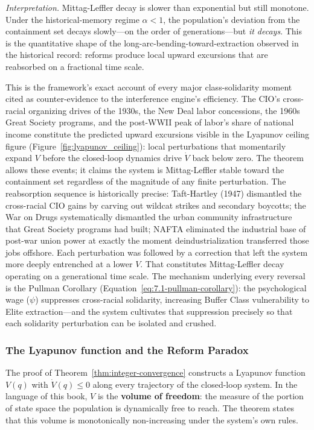 \noindent \textit{Interpretation.} Mittag-Leffler decay is slower than exponential but still monotone. Under the historical-memory regime $\alpha < 1$, the population's deviation from the containment set decays slowly---on the order of generations---but \textit{it decays}. This is the quantitative shape of the long-arc-bending-toward-extraction observed in the historical record: reforms produce local upward excursions that are reabsorbed on a fractional time scale.

This is the framework's exact account of every major class-solidarity moment cited as counter-evidence to the interference engine's efficiency. The CIO's cross-racial organizing drives of the 1930s, the New Deal labor concessions, the 1960s Great Society programs, and the post-WWII peak of labor's share of national income constitute the predicted upward excursions visible in the Lyapunov ceiling figure (Figure~\ref{fig:lyapunov_ceiling}): local perturbations that momentarily expand $V$ before the closed-loop dynamics drive $\dot V$ back below zero. The theorem allows these events; it claims the system is Mittag-Leffler stable toward the containment set regardless of the magnitude of any finite perturbation. The reabsorption sequence is historically precise: Taft-Hartley (1947) dismantled the cross-racial CIO gains by carving out wildcat strikes and secondary boycotts; the War on Drugs systematically dismantled the urban community infrastructure that Great Society programs had built; NAFTA eliminated the industrial base of post-war union power at exactly the moment deindustrialization transferred those jobs offshore. Each perturbation was followed by a correction that left the system more deeply entrenched at a lower $V$. That constitutes Mittag-Leffler decay operating on a generational time scale. The mechanism underlying every reversal is the Pullman Corollary (Equation~\ref{eq:7.1-pullman-corollary}): the psychological wage ($\psi$) suppresses cross-racial solidarity, increasing Buffer Class vulnerability to Elite extraction---and the system cultivates that suppression precisely so that each solidarity perturbation can be isolated and crushed.

\subsubsection*{The Lyapunov function and the Reform Paradox}

The proof of Theorem~\ref{thm:integer-convergence} constructs a Lyapunov function $V(q)$ with $\dot V(q) \leq 0$ along every trajectory of the closed-loop system. In the language of this book, $V$ is the \textbf{volume of freedom}: the measure of the portion of state space the population is dynamically free to reach. The theorem states that this volume is monotonically non-increasing under the system's own rules.

